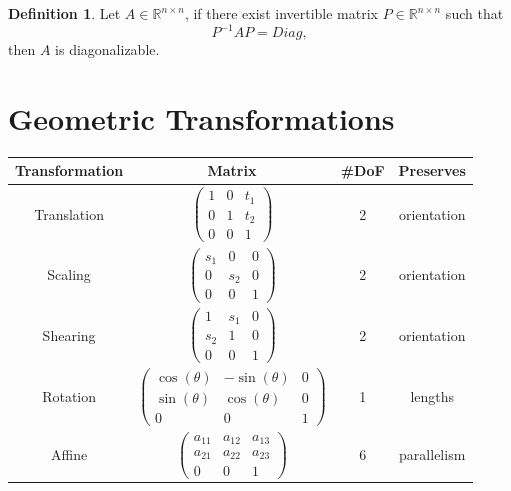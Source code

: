 \documentclass[a4paper]{article}
\theoremstyle{definition}
\newtheorem{definition}{Definition}
\theoremstyle{plain}
\begin{document}
\begin{definition}
 Let $A\in\mathbb{R}^{n\times n}$, if there exist invertible matrix $P\in\mathbb{R}^{n\times n}$ such that 
\begin{equation*}
    P^{-1}AP=Diag,
\end{equation*}
then $A$ is diagonalizable.
\end{definition}

\newpage
\section{Geometric Transformations}
\begin{table}[H]
\centering
\begin{tabular}{cccc}
\hline
\textbf{Transformation} & \multicolumn{1}{c}{\textbf{Matrix}} & \textbf{\#DoF} & \textbf{Preserves} \\ \hline
Translation             & $\begin{pmatrix} 1 & 0 & t_1\\ 0 & 1 & t_2\\ 0 & 0 & 1\end{pmatrix}$ & 2              & orientation        \\
Scaling                 & $\begin{pmatrix} s_{1} & 0 & 0\\ 0 & s_{2} & 0\\ 0 & 0 & 1\end{pmatrix}$  & 2 & orientation\\
Shearing                 & $\begin{pmatrix} 1 & s_{1} & 0\\ s_{2} & 1 & 0\\ 0 & 0 & 1\end{pmatrix}$  & 2 & orientation\\
Rotation       & $\begin{pmatrix} \cos(\theta) & -\sin(\theta) & 0\\ \sin(\theta) & \cos(\theta) & 0\\ 0 & 0 & 1\end{pmatrix}$ & 1              & lengths            \\
Affine                  & $\begin{pmatrix} a_{11} & a_{12} & a_{13}\\ a_{21} & a_{22} & a_{23}\\ 0 & 0 & 1\end{pmatrix}$ & 6              & parallelism        \\\hline
\end{tabular}
\end{table}
\end{document}
